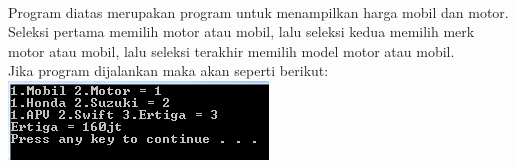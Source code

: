 \documentclass[a4paper,12pt]{article}
\begin{document}
    \paragraph{}
    Program diatas merupakan program untuk menampilkan harga mobil dan motor. Seleksi pertama memilih motor atau mobil, lalu seleksi kedua memilih merk motor atau mobil, lalu seleksi terakhir memilih model motor atau mobil.\\
    Jika program dijalankan maka akan seperti berikut:\\
    \includegraphics{Latihan3.PNG}
\end{document}

